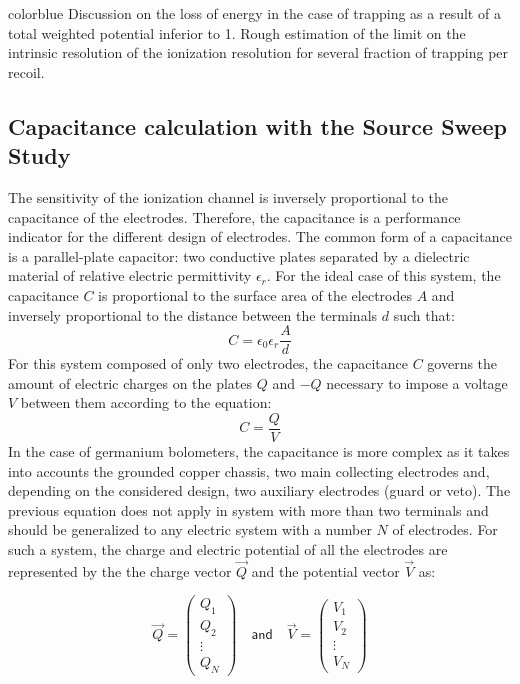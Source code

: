 { color{blue} Discussion on the loss of energy in the case of trapping as a result of a total weighted potential inferior to 1. Rough estimation of the limit on the intrinsic resolution of the ionization resolution for several fraction of trapping per recoil.}


\subsection{Capacitance calculation with the Source Sweep Study}

The sensitivity of the ionization channel is inversely proportional to the capacitance of the electrodes. Therefore, the capacitance is a performance indicator for the different design of electrodes.
The common form of a capacitance is a parallel-plate capacitor: two conductive plates separated by a dielectric material of relative electric permittivity $\epsilon_r$. For the ideal case of this system, the capacitance $C$ is proportional to the surface area of the electrodes $A$ and inversely proportional to the distance between the terminals $d$ such that:
\begin{equation}
C = \epsilon_0 \epsilon_r \frac{A}{d}
\end{equation}
For this system composed of only two electrodes, the capacitance $C$ governs the amount of electric charges on the plates $Q$ and $-Q$ necessary to impose a voltage $V$ between them according to the equation:
 \begin{equation}
 \label{eq:capacitance-definition-simple}
C = \frac{Q}{V}
\end{equation}
In the case of germanium bolometers, the capacitance is more complex as it takes into accounts the grounded copper chassis, two main collecting electrodes and, depending on the considered design, two auxiliary electrodes (guard or veto). The previous equation does not apply in system with more than two terminals and should be generalized to any electric system with a number $N$ of electrodes. For such a system, the charge and electric potential of all the electrodes are represented by the the charge vector $\vec{Q}$ and the potential vector $\vec{V}$ as:

\begin{equation} 
\label{eq:vector-charge-potential}
\vec{Q} = 
\begin{pmatrix}
Q_{1} \\ 
Q_{2} \\ 
\vdots \\ 
Q_{N}
\end{pmatrix} 
\quad \textsf{and} \quad
\vec{V} = 
\begin{pmatrix}
V_{1} \\ 
V_{2} \\ 
\vdots \\
V_{N}
\end{pmatrix} 
\end{equation}

